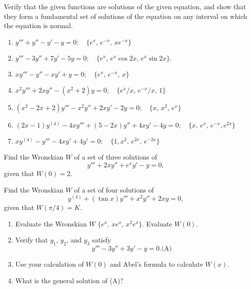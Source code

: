 \documentclass{ximera}
\begin{document}
\begin{problem}\label{exer:9.1.6}
Verify that the given functions are solutions of the given equation, and show that they  form a fundamental set of solutions of the
equation on any interval on which the equation is normal.

\begin{enumerate}
     
\item $y'''+y''-y'-y=0;  \quad\{e^x,\,e^{-x},\,xe^{-x}\}$

\item $y'''-3y''+7y'-5y=0;  \quad\{e^x,\,e^x\cos2x,\,e^x\sin2x\}$.

\item $xy'''-y''-xy'+y=0;  \quad \{e^x,\,e^{-x},\,x\}$

\item $x^2y'''+2xy''-(x^2+2)y=0;  \quad\{e^x/ x,\,e^{-x}/
x,\,1\}$

\item $(x^2-2x+2)y'''-x^2y''+2xy'-2y=0;  \quad \{x,\,x^2,\,e^x\}$

\item
$(2x-1)y^{(4)}-4xy'''+(5-2x)y''+4xy'-4y=0;
\quad\{x,\,e^x,\,e^{-x},e^{2x}\}$

\item $xy^{(4)}-y'''-4xy'+4y'=0;  \quad\{1,x^2,\,e^{2x},\,e^{-2x}\}$
\end{enumerate}
\end{problem}

\begin{problem}\label{exer:9.1.7}Find the Wronskian $W$ of a set of three solutions of 
$$ y'''+2xy''+e^xy'-y=0, $$ given that $W(0)=2$.
\end{problem}

\begin{problem}\label{exer:9.1.8}
Find the Wronskian $W$ of a set of four solutions of
$$
y^{(4)}+(\tan x)y'''+x^2y''+2xy=0,
$$
given that $W(\pi/4)=K$.
\end{problem}

\begin{problem}\label{exer:9.1.9}
\begin{enumerate}
\item %
Evaluate the Wronskian $W$ $\{e^x,\,xe^x,\,
x^2e^x\}$. Evaluate $W(0)$.

\item %
Verify that $y_1$, $y_2$, and $y_3$ satisfy
$$
y'''-3y''+3y'-y=0.
\text{(A)}
$$

\item %
Use your calculation of $W(0)$ and Abel's formula to calculate $W(x)$.

\item %
What is the general solution of  (A)?
\end{enumerate}
\end{problem}
\end{document}

